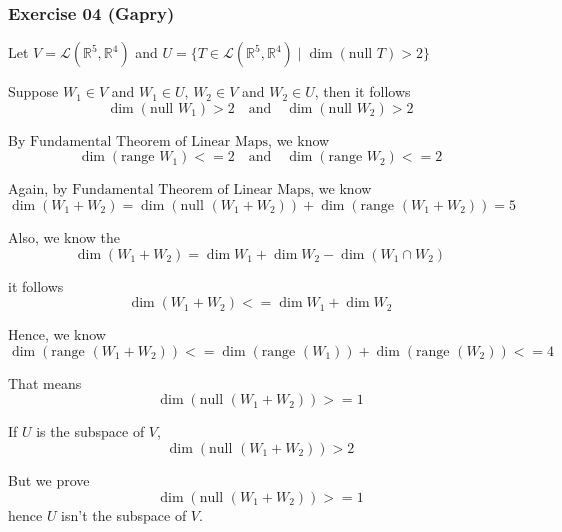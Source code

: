 \subsubsection*{Exercise 04 (Gapry)}

\begin{flushleft}

Let \( V = \mathcal{L}(\mathbb{R}^5, \mathbb{R}^4) \) and
\(
U = \{ T \in \mathcal{L}(\mathbb{R}^5, \mathbb{R}^4) \mid \dim(\text{null } T) > 2 \}
\) \newline

Suppose \( W_1 \in V \) and \( W_1 \in U \), \( W_2 \in V \) and \( W_2 \in U \), then it follows 
\[
\dim(\text{null } W_1) > 2 \quad \text{and} \quad \dim(\text{null } W_2) > 2
\]

By $\text{Fundamental Theorem of Linear Maps}$, we know 
\[
\dim(\text{range } W_1) <= 2 \quad \text{and} \quad \dim(\text{range } W_2) <= 2
\]

Again, by $\text{Fundamental Theorem of Linear Maps}$, we know 
\[
\dim(W_1 + W_2) = \dim(\text{null } (W_1 + W_2)) + \dim(\text{range } (W_1 + W_2)) = 5 
\]

Also, we know the 
\[
\dim(W_1 + W_2) = \dim W_1 + \dim W_2 - \dim(W_1 \cap W_2)
\]

it follows 
\[
\dim(W_1 + W_2) <= \dim W_1 + \dim W_2
\]

Hence, we know 
\[
\dim(\text{range } (W_1 + W_2)) <= \dim(\text{range } (W_1)) + \dim(\text{range } (W_2)) <= 4
\]

That means 
\[
\dim(\text{null } (W_1 + W_2)) >= 1
\]

If $U$ is the subspace of $V$, 
\[
\dim(\text{null } (W_1 + W_2)) > 2
\]

But we prove 
\[
\dim(\text{null } (W_1 + W_2)) >= 1
\]
hence $U$ isn't the subspace of $V$.

\end{flushleft}